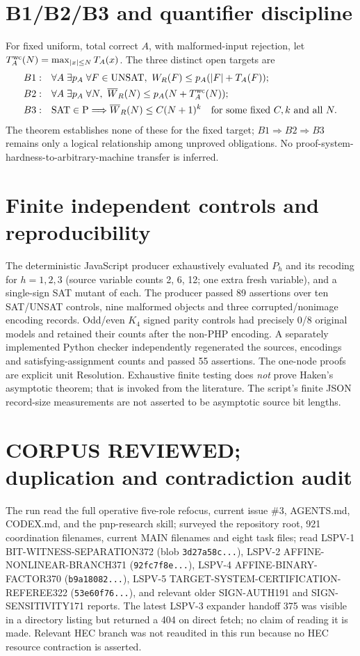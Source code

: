 \documentclass[11pt]{article}
\begin{document}
\section*{B1/B2/B3 and quantifier discipline}
For fixed uniform, total correct $A$, with malformed-input rejection, let $T_A^{\rm wc}(N)=\max_{|x|\le N}T_A(x)$. The three distinct open targets are
\[
\begin{aligned}
 B1:&\quad \forall A\;\exists p_A\;\forall F\in\mathrm{UNSAT},\ 
  W_R(F)\le p_A(|F|+T_A(F));\\
 B2:&\quad \forall A\;\exists p_A\;\forall N,\ 
  \overline W_R(N)\le p_A(N+T_A^{\rm wc}(N));\\
 B3:&\quad \mathrm{SAT}\in\mathrm{P}\Longrightarrow \overline W_R(N)\le C(N+1)^k
  \quad\text{for some fixed }C,k\text{ and all }N.
\end{aligned}
\]
The theorem establishes none of these for the fixed target; $B1\Rightarrow B2\Rightarrow B3$ remains only a logical relationship among unproved obligations. No proof-system-hardness-to-arbitrary-machine transfer is inferred.

\section*{Finite independent controls and reproducibility}
The deterministic JavaScript producer exhaustively evaluated $P_h$ and its recoding for $h=1,2,3$ (source variable counts 2, 6, 12; one extra fresh variable), and a single-sign SAT mutant of each. The producer passed 89 assertions over ten SAT/UNSAT controls, nine malformed objects and three corrupted/nonimage encoding records. Odd/even $K_4$ signed parity controls had precisely 0/8 original models and retained their counts after the non-PHP encoding. A separately implemented Python checker independently regenerated the sources, encodings and satisfying-assignment counts and passed 55 assertions. The one-node proofs are explicit unit Resolution. Exhaustive finite testing does \emph{not} prove Haken's asymptotic theorem; that is invoked from the literature. The script's finite JSON record-size measurements are not asserted to be asymptotic source bit lengths.

\section*{CORPUS REVIEWED; duplication and contradiction audit}
The run read the full operative five-role refocus, current issue \#3, AGENTS.md, CODEX.md, and the pnp-research skill; surveyed the repository root, 921 coordination filenames, current MAIN filenames and eight task files; read LSPV-1 BIT-WITNESS-SEPARATION372 (blob \texttt{3d27a58c...}), LSPV-2 AFFINE-NONLINEAR-BRANCH371 (\texttt{92fc7f8e...}), LSPV-4 AFFINE-BINARY-FACTOR370 (\texttt{b9a18082...}), LSPV-5 TARGET-SYSTEM-CERTIFICATION-REFEREE322 (\texttt{53e60f76...}), and relevant older SIGN-AUTH191 and SIGN-SENSITIVITY171 reports. The latest LSPV-3 expander handoff 375 was visible in a directory listing but returned a 404 on direct fetch; no claim of reading it is made. Relevant HEC branch was not reaudited in this run because no HEC resource contraction is asserted.
\end{document}
